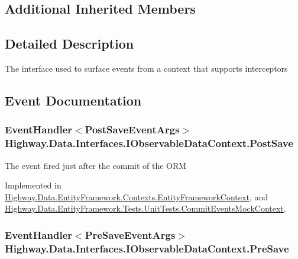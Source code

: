 \subsection*{Additional Inherited Members}


\subsection{Detailed Description}
The interface used to surface events from a context that supports interceptors 



\subsection{Event Documentation}
\hypertarget{interface_highway_1_1_data_1_1_interfaces_1_1_i_observable_data_context_a1978b914f7b94a37a6e86f3314326ca9}{
\subsubsection[{Post\-Save}]{\setlength{\rightskip}{0pt plus 5cm}Event\-Handler$<${\bf Post\-Save\-Event\-Args}$>$ Highway.\-Data.\-Interfaces.\-I\-Observable\-Data\-Context.\-Post\-Save}}\label{interface_highway_1_1_data_1_1_interfaces_1_1_i_observable_data_context_a1978b914f7b94a37a6e86f3314326ca9}


The event fired just after the commit of the O\-R\-M 



Implemented in \hyperlink{class_highway_1_1_data_1_1_entity_framework_1_1_contexts_1_1_entity_framework_context_a2297153144a3e1240cb4526eb963b889}{Highway.\-Data.\-Entity\-Framework.\-Contexts.\-Entity\-Framework\-Context}, and \hyperlink{class_highway_1_1_data_1_1_entity_framework_1_1_tests_1_1_unit_tests_1_1_commit_events_mock_context_acc706858c7a83909f5ec24ae9829add8}{Highway.\-Data.\-Entity\-Framework.\-Tests.\-Unit\-Tests.\-Commit\-Events\-Mock\-Context}.

\hypertarget{interface_highway_1_1_data_1_1_interfaces_1_1_i_observable_data_context_add85ecbc05ebf7174003841bdbd72dfe}{
\subsubsection[{Pre\-Save}]{\setlength{\rightskip}{0pt plus 5cm}Event\-Handler$<${\bf Pre\-Save\-Event\-Args}$>$ Highway.\-Data.\-Interfaces.\-I\-Observable\-Data\-Context.\-Pre\-Save}}\label{interface_highway_1_1_data_1_1_interfaces_1_1_i_observable_data_context_add85ecbc05ebf7174003841bdbd72dfe}


